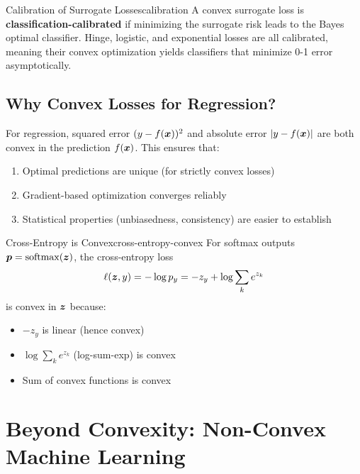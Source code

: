 \documentclass[../../main.tex]{subfiles}
\begin{document}
\begin{theorem}{Calibration of Surrogate Losses}{calibration}
A convex surrogate loss is \textbf{classification-calibrated} if minimizing the surrogate risk leads to the Bayes optimal classifier. Hinge, logistic, and exponential losses are all calibrated, meaning their convex optimization yields classifiers that minimize 0-1 error asymptotically.
\end{theorem}

\subsection{Why Convex Losses for Regression?}

\begin{principle}
For regression, squared error $(y - f(\boldsymbol{x}))^2$ and absolute error $|y - f(\boldsymbol{x})|$ are both convex in the prediction $f(\boldsymbol{x})$. This ensures that:
\begin{enumerate}
    \item Optimal predictions are unique (for strictly convex losses)
    \item Gradient-based optimization converges reliably
    \item Statistical properties (unbiasedness, consistency) are easier to establish
\end{enumerate}
\end{principle}

\begin{example}{Cross-Entropy is Convex}{cross-entropy-convex}
For softmax outputs $\boldsymbol{p} = \operatorname{softmax}(\boldsymbol{z})$, the cross-entropy loss
\[
    \ell(\boldsymbol{z}, y) = -\log p_y = -z_y + \log\sum_k e^{z_k}
\]
is convex in $\boldsymbol{z}$ because:
\begin{itemize}
    \item $-z_y$ is linear (hence convex)
    \item $\log\sum_k e^{z_k}$ (log-sum-exp) is convex
    \item Sum of convex functions is convex
\end{itemize}
\end{example}

\section{Beyond Convexity: Non-Convex Machine Learning}
\label{sec:beyond-convex}
\end{document}
